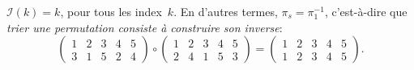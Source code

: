 \(\mathcal{I}(k) = k\), pour tous les index~\(k\). En d'autres termes,
\(\pi_s = \pi_1^{-1}\), c'est-à-dire que \emph{trier une permutation
  consiste à construire son inverse}:
\begin{equation*}
\begin{pmatrix}
1 & 2 & 3 & 4 & 5\\
3 & 1 & 5 & 2 & 4
\end{pmatrix}
\circ
\begin{pmatrix}
1 & 2 & 3 & 4 & 5\\
2 & 4 & 1 & 5 & 3
\end{pmatrix}
=
\begin{pmatrix}
1 & 2 & 3 & 4 & 5\\
1 & 2 & 3 & 4 & 5
\end{pmatrix}.
\end{equation*}


